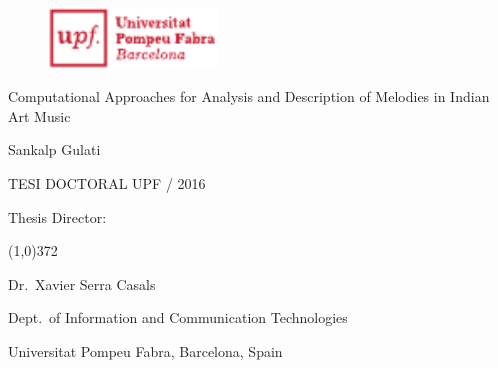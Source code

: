 
\newpage
\thispagestyle{empty}
\begin{titlingpage}
\begin{flushright}

  \begin{figure}[t]
    \begin{flushright}
      \includegraphics[width=4.5cm]{ch00/figures/upf-logo-bo}
    \end{flushright}
  \end{figure}

  \vspace*{2.2cm} 

  {\huge {Computational Approaches for Analysis and Description of Melodies in Indian Art Music}}
  
  \vspace*{2cm}

  {\Large {Sankalp Gulati}}
  
  \vspace*{\fill} 
  TESI DOCTORAL UPF / 2016

\end{flushright}
  
  \vspace*{1.5cm}

  Thesis Director:

  \vspace*{-0.25cm}

  \line(1,0){372}
  
  \vspace*{0.25cm}

  Dr.~Xavier Serra Casals

  Dept.~of Information and Communication Technologies

  Universitat Pompeu Fabra, Barcelona, Spain
  
\end{titlingpage}

